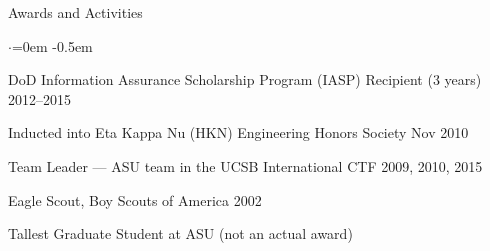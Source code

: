 \documentclass{resume} %
\begin{document}

\begin{rSection}{Awards and Activities}

\begin{list}{$\cdot$}{\leftmargin=0em} %
   \itemsep -0.5em
	
	\item DoD Information Assurance Scholarship Program (IASP) Recipient (3 years) \hfill 2012--2015

	\item Inducted into Eta Kappa Nu (HKN) Engineering Honors Society \hfill Nov 2010
	
	\item Team Leader --- ASU team in the UCSB International CTF \hfill 2009, 2010, 2015
	
	\item Eagle Scout, Boy Scouts of America \hfill 2002
	
	\item Tallest Graduate Student at ASU \hfill (not an actual award)

\end{list}

\end{rSection}





\end{document}
